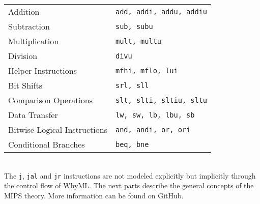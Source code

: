 \vspace{0.2cm}
\begin{tabular} {|l||l|}
\hline
Addition &  \verb"add, addi, addu, addiu" \\
Subtraction &  \verb"sub, subu" \\
Multiplication & \verb"mult, multu" \\
Division & \verb"divu" \\
Helper Instructions & \verb"mfhi, mflo, lui" \\
Bit Shifts & \verb"srl, sll" \\
Comparison Operations & \verb"slt, slti, sltiu, sltu" \\
Data Transfer &  \verb"lw, sw, lb, lbu, sb" \\ 
Bitwise Logical Instructions & \verb"and, andi, or, ori" \\ 
Conditional Branches & \verb"beq, bne" \\
\hline
\end{tabular} \\
The \verb"j", \verb"jal" and \verb"jr" instructions are not modeled explicitly but implicitly 
through the control flow of WhyML. 
The next parts describe the general concepts of the MIPS theory. 
More information can be found on GitHub.

